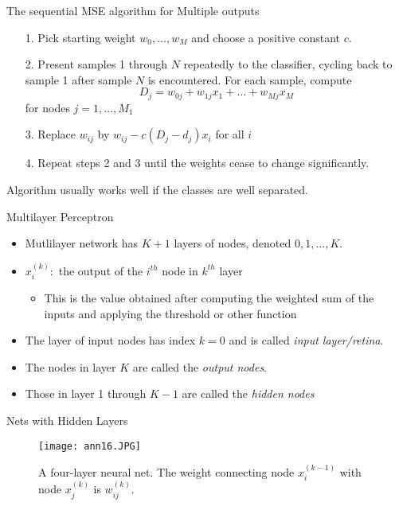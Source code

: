 \begin{frame}{The sequential MSE algorithm for Multiple outputs}
\begin{itemize}
\item[1.] Pick starting weight $w_0,\ldots,w_M$ and choose a positive constant $c$.
\item[2.] Present samples 1 through $N$ repeatedly to the classifier, cycling back to sample 1 after sample $N$ is encountered. For each sample, compute
\begin{equation}
D_j=w_{0j}+w_{1j}x_1+\ldots+w_{Mj}x_M\nonumber
\end{equation}
for nodes $j=1,\ldots,M_1$
\item[3.] Replace $w_{ij}$ by $w_{ij}-c(D_j-d_j)x_i$ for all $i$
\item[4.] Repeat steps 2 and 3 until the weights cease to change significantly.
\end{itemize}
Algorithm usually works well if the classes are well separated.
\end{frame}

\begin{frame}{Multilayer Perceptron}
\begin{itemize}
\item Mutlilayer network has $K+1$ layers of nodes, denoted $0,1,\ldots,K$.
\item $x_i^{(k)}: $ the output of the $i^{th}$ node in $k^{th}$ layer
\begin{itemize}
\item This is the value obtained after computing the weighted sum of the inputs and applying the threshold or other function
\end{itemize}
\item The layer of input nodes has index $k=0$ and is called \textit{\color{slidecolor}input layer/retina}.
\item The nodes in layer $K$ are called the \textit{\color{slidecolor}output nodes}.
\item Those in layer 1 through $K-1$ are called the \textit{\color{slidecolor}hidden nodes}
\end{itemize}
\end{frame}

\begin{frame}{Nets with Hidden Layers}
\begin{figure}
\texttt{[image: ann16.JPG]}
\caption{A four-layer neural net. The weight connecting node $x_i^{(k-1)}$ with node $x_j^{(k)}$ is $w_{ij}^{(k)}$.}
\end{figure}
\end{frame}

